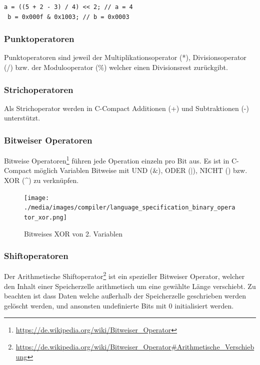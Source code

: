 \begin{lstlisting}[language=CMM]
 a = ((5 + 2 - 3) / 4) << 2; // a = 4
 b = 0x000f & 0x1003; // b = 0x0003
\end{lstlisting}

\subsubsection{Punktoperatoren}

Punktoperatoren sind jeweil der Multiplikationsoperator (*), Divisionsoperator (/) bzw. der Modulooperator (\%) welcher einen Divisionsrest zur\"uckgibt.

\subsubsection{Strichoperatoren}

Als Strichoperator werden in C-Compact Additionen (+) und Subtraktionen (-) unterst\"utzt.

\subsubsection{Bitweiser Operatoren}

Bitweise Operatoren\footnote{\url{https://de.wikipedia.org/wiki/Bitweiser_Operator}} f\"uhren jede Operation einzeln pro Bit aus. Es ist in C-Compact m\"oglich Variablen Bitweise mit UND ($\&$), ODER ($|$), NICHT (\raisebox{-0.9ex}{\~{ }}) bzw. 
XOR (\^{}) zu verkn\"upfen.

\begin{figure}[h]
\centering
\texttt{[image: ./media/images/compiler/language\_specification\_binary\_operator\_xor.png]}
\caption{Bitweises XOR von 2. Variablen}
\label{language_specification_binary_operator_xor}
\end{figure}

\newpage
\subsubsection{Shiftoperatoren}

Der Arithmetische Shiftoperator\footnote{\url{https://de.wikipedia.org/wiki/Bitweiser_Operator\#Arithmetische_Verschiebung}} ist ein spezieller Bitweiser Operator, welcher den Inhalt einer Speicherzelle arithmetisch um eine gew\"ahlte L\"ange verschiebt. Zu beachten ist dass Daten welche außerhalb der Speicherzelle geschrieben werden gel\"oscht werden, und ansonsten undefinierte Bits mit 0 initialisiert werden.

